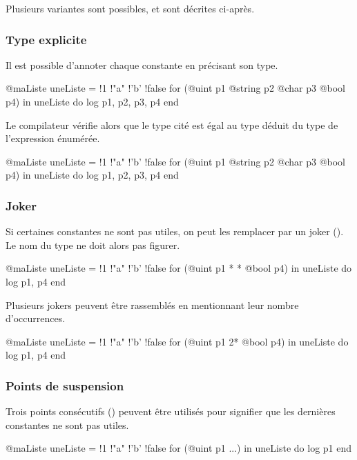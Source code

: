 {Plusieurs variantes sont possibles, et sont décrites ci-après.

\subsubsection{Type explicite}

Il est possible d'annoter chaque constante en précisant son type.

\begin{galgascode}
@maListe uneListe = {!1 !"a" !'b' !false}
for (@uint p1 @string p2 @char p3 @bool p4) in uneListe do
  log p1, p2, p3, p4
end
\end{galgascode}

Le compilateur vérifie alors que le type cité est égal au type déduit du type de l'expression énumérée.
\begin{galgascode}
@maListe uneListe = {!1 !"a" !'b' !false}
for (@uint p1 @string p2 @char p3 @bool p4) in uneListe do
  log p1, p2, p3, p4
end
\end{galgascode}


\subsubsection{Joker}

Si certaines constantes ne sont pas utiles, on peut les remplacer par un joker (\galgas{*}). Le nom du type ne doit alors pas figurer.
\begin{galgascode}
@maListe uneListe = {!1 !"a" !'b' !false}
for (@uint p1 * * @bool p4) in uneListe do
  log p1, p4
end
\end{galgascode}

Plusieurs jokers peuvent être rassemblés en mentionnant leur nombre d'occurrences.
\begin{galgascode}
@maListe uneListe = {!1 !"a" !'b' !false}
for (@uint p1 2* @bool p4) in uneListe do
  log p1, p4
end
\end{galgascode}



\subsubsection{Points de suspension}

Trois points consécutifs () peuvent être utilisés pour signifier que les dernières constantes ne sont pas utiles.

\begin{galgascode}
@maListe uneListe = {!1 !"a" !'b' !false}
for (@uint p1 ...) in uneListe do
  log p1
end
\end{galgascode}

}
